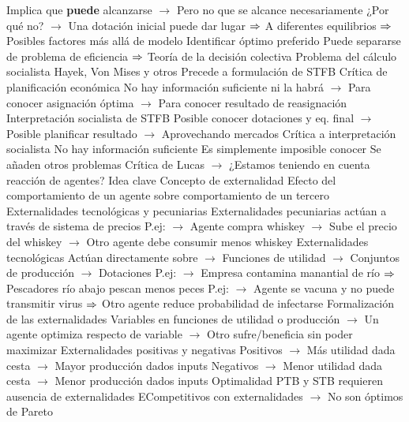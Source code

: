 \documentclass{nuevotema}
\begin{document}
\begin{esquemal}
				\4[] Implica que \textbf{puede} alcanzarse
				\4[] $\to$ Pero no que se alcance necesariamente
				\4[] ¿Por qué no?
				\4[] $\to$ Una dotación inicial puede dar lugar
				\4[] $\Rightarrow$ A diferentes equilibrios
				\4[] $\Rightarrow$ Posibles factores más allá de modelo
				\4 Identificar óptimo preferido
				\4[] Puede separarse de problema de eficiencia
				\4[] $\Rightarrow$ Teoría de la decisión colectiva
			\3 Problema del cálculo socialista
				\4 Hayek, Von Mises y otros
				\4[] Precede a formulación de STFB
				\4 Crítica de planificación económica
				\4[] No hay información suficiente ni la habrá
				\4[] $\to$ Para conocer asignación óptima
				\4[] $\to$ Para conocer resultado de reasignación
				\4 Interpretación socialista de STFB
				\4[] Posible conocer dotaciones y eq. final
				\4[] $\to$ Posible planificar resultado
				\4[] $\to$ Aprovechando mercados
				\4 Crítica a interpretación socialista
				\4[] No hay información suficiente
				\4[] Es simplemente imposible conocer
				\4 Se añaden otros problemas
				\4[] Crítica de Lucas
				\4[] $\to$ ¿Estamos teniendo en cuenta reacción de agentes?
	\1 
		\2 Idea clave
			\3 Concepto de externalidad
				\4 Efecto del comportamiento de un agente
				\4[] sobre comportamiento de un tercero
			\3 Externalidades tecnológicas y pecuniarias
				\4 Externalidades pecuniarias actúan
				\4[] a través de sistema de precios
				\4[] P.ej:
				\4[] $\to$ Agente compra whiskey
				\4[] $\to$ Sube el precio del whiskey
				\4[] $\to$ Otro agente debe consumir menos whiskey
				\4 Externalidades tecnológicas
				\4[] Actúan directamente sobre
				\4[] $\to$ Funciones de utilidad
				\4[] $\to$ Conjuntos de producción
				\4[] $\to$ Dotaciones
				\4[] P.ej:
				\4[] $\to$ Empresa contamina manantial de río
				\4[] $\Rightarrow$ Pescadores río abajo pescan menos peces
				\4[] P.ej:
				\4[] $\to$ Agente se vacuna y no puede transmitir virus
				\4[] $\Rightarrow$ Otro agente reduce probabilidad de infectarse
				\4[] Formalización de las externalidades
				\4[] Variables en funciones de utilidad o producción
				\4[] $\to$ Un agente optimiza respecto de variable
				\4[] $\to$ Otro sufre/beneficia sin poder maximizar
			\3 Externalidades positivas y negativas
				\4 Positivos
				\4[] $\to$ Más utilidad dada cesta
				\4[] $\to$ Mayor producción dados inputs
				\4 Negativos
				\4[] $\to$ Menor utilidad dada cesta
				\4[] $\to$ Menor producción dados inputs
			\3 Optimalidad
				\4 PTB y STB requieren ausencia de externalidades
				\4[] ECompetitivos con externalidades
				\4[] $\to$ No son óptimos de Pareto

\end{esquemal}
\end{document}
